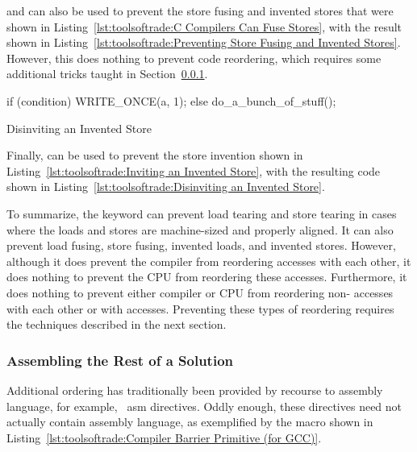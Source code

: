  and  can also be used to prevent the
store fusing and invented stores that were shown in
Listing~\ref{lst:toolsoftrade:C Compilers Can Fuse Stores},
with the result shown in
Listing~\ref{lst:toolsoftrade:Preventing Store Fusing and Invented Stores}.
However, this does nothing to prevent code reordering, which requires
some additional tricks taught in
Section~\ref{sec:toolsoftrade:Assembling the Rest of a Solution}.

\begin{listing}[tbp]
\begin{fcvlabel}
\begin{VerbatimL}[commandchars=\\\{\}]
if (condition)
	WRITE_ONCE(a, 1);
else
	do_a_bunch_of_stuff();
\end{VerbatimL}
\end{fcvlabel}
\caption{Disinviting an Invented Store}
\label{lst:toolsoftrade:Disinviting an Invented Store}
\end{listing}

Finally,  can be used to prevent the store invention
shown in
Listing~\ref{lst:toolsoftrade:Inviting an Invented Store},
with the resulting code shown in
Listing~\ref{lst:toolsoftrade:Disinviting an Invented Store}.

To summarize, the  keyword can prevent load
tearing and store tearing in cases where the loads and stores are
machine-sized and properly aligned.
It can also prevent load fusing, store fusing, invented loads, and
invented stores.
However, although it does prevent the compiler from reordering 
accesses with each other, it does nothing to prevent the
CPU from reordering these accesses.
Furthermore, it does nothing to prevent either compiler or CPU from
reordering non- accesses with each other or with
 accesses.
Preventing these types of reordering requires the techniques described
in the next section.

\subsubsection{Assembling the Rest of a Solution}
\label{sec:toolsoftrade:Assembling the Rest of a Solution}

Additional ordering has traditionally been provided by recourse to
assembly language, for example, \GCC\ asm directives.
Oddly enough, these directives need not actually contain assembly language,
as exemplified by the  macro shown in
Listing~\ref{lst:toolsoftrade:Compiler Barrier Primitive (for GCC)}.

